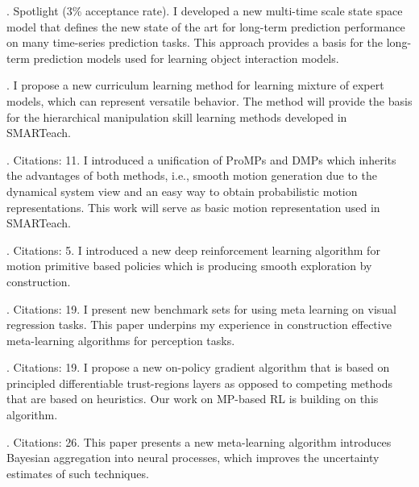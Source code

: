 \begin{asparaitem}
\item {}. Spotlight (3\% acceptance rate). 
I developed a new multi-time scale state space model that defines the new state of the art for long-term prediction performance on many time-series prediction tasks. This approach provides a basis for the long-term prediction models used for learning object interaction models.

\item {}.   I propose a new curriculum learning method for learning mixture of expert models, which can represent versatile behavior. The method will provide the basis for the hierarchical manipulation skill learning methods developed in SMARTeach.

\item {}. Citations: 11. I introduced a unification of ProMPs  and DMPs which inherits the advantages of both methods, i.e., smooth motion generation due to the dynamical system view and an easy way to obtain probabilistic motion representations. This work will serve as basic motion representation used in SMARTeach.  

\item {}. Citations: 5. I introduced a new deep reinforcement learning algorithm for  motion primitive based policies which is producing smooth exploration by construction. 

\item {}. Citations: 19. I present new benchmark sets for using meta learning on visual regression tasks. This paper underpins my experience in construction effective meta-learning algorithms for perception tasks. 

\item {}. Citations: 19. I propose a new on-policy gradient algorithm that is based on principled differentiable trust-regions layers as opposed to competing methods that are based on heuristics. Our work on MP-based RL is building on this algorithm. 

\item {}. Citations: 26. This paper presents a new meta-learning algorithm introduces Bayesian aggregation into neural processes, which improves the uncertainty estimates of such techniques. 


\end{asparaitem}
